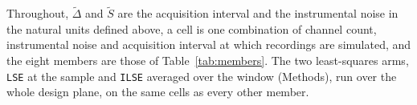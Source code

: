 Throughout, $\widetilde{\Delta}$ and $\widetilde{S}$ are the acquisition interval and the instrumental noise in the natural units defined above, a cell is one combination of channel count, instrumental noise and acquisition interval at which recordings are simulated, and the eight members are those of Table~\ref{tab:members}.
The two least-squares arms, \texttt{LSE} at the sample and \texttt{ILSE} averaged over the window (Methods), run over the whole design plane, on the same cells as every other member. %
